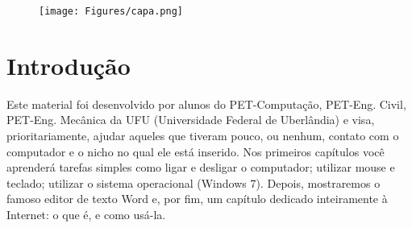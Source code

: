 \documentclass[hidelinks,12pt]{article}
\newcommand{\bigicon}[1]{\texttt{[image: \#1]}}
\newcommand{\iconb}[1]{\texttt{[image: \#1]}}
\begin{document}
\pagestyle{fancy}


\lhead{\bigicon{Figures/ufu}}
\rhead{\bigicon{Figures/facom}}
\lfoot{}
\cfoot{}
\rfoot{}
\vspace*{1cm}
\begin{figure}[!h]
	\centering
	\texttt{[image: Figures/capa.png]}

\end{figure}


\newpage
\fancyhead[C]{}
\fancyhead[R]{\iconb{Figures/comppet}}
\fancyhead[L]{\leftmark}
\fancyfoot{}
\fancyfoot[C]{\hspace{3.0cm}\thepage}


\tableofcontents
\listoffigures

{\let\thefootnote\relax{}}

{\let\thefootnote\relax{}}

{\let\thefootnote\relax{}}

\newpage

\section{Introdução}

 Este material foi desenvolvido por alunos do PET-Computação, PET-Eng. Civil, PET-Eng. Mecânica da UFU (Universidade Federal de Uberlândia) e visa, prioritariamente, ajudar aqueles que tiveram pouco, ou nenhum, contato com o computador e o nicho no qual ele está inserido. Nos primeiros capítulos você aprenderá tarefas simples como ligar e desligar o computador; utilizar mouse e teclado; utilizar o sistema operacional (Windows 7). Depois, mostraremos o famoso editor de texto Word e, por fim, um capítulo dedicado inteiramente à Internet: o que é, e como usá-la.
 
\end{document}
